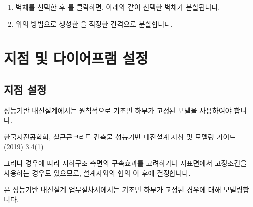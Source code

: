 \documentclass[a4paper,11pt,korean,openany,oneside]{sphinxmanual}
\begin{document}
\begin{sphinxShadowBox}
\begin{enumerate}
\newpage

\begin{center}
\noindent{}
\end{center}

\item {} 
\sphinxAtStartPar
벽체를 선택한 후 를 클릭하면, 아래와 같이 선택한 벽체가 분할됩니다.

\begin{center}
\noindent{}
\end{center}

\item {} 
\sphinxAtStartPar
위의 방법으로 생성한 을 적정한 간격으로 분할합니다.

\end{enumerate}
\end{sphinxShadowBox}

\sphinxstepscope


\section{지점 및 다이어프램 설정}
\label{\detokenize{1_support_setting:id1}}\label{\detokenize{1_support_setting::doc}}

\subsection{지점 설정}
\label{\detokenize{1_support_setting:id2}}
\sphinxAtStartPar
성능기반 내진설계에서는 원칙적으로 기초면 하부가 고정된 모델을 사용하여야 합니다. %
\begin{footnote}[1]\sphinxAtStartFootnote
한국지진공학회, 철근콘크리트 건축물 성능기반 내진설계 지침 및 모델링 가이드(2019) 3.4\sphinxhyphen{}(1)
%
\end{footnote}
그러나 경우에 따라 지하구조 측면의 구속효과를 고려하거나 지표면에서 고정조건을 사용하는 경우도 있으므로, 설계자와의 협의 이 후에 결정합니다.

\sphinxAtStartPar
본 성능기반 내진설계 업무절차서에서는 기초면 하부가 고정된 경우에 대해 모델링합니다.
\end{document}
